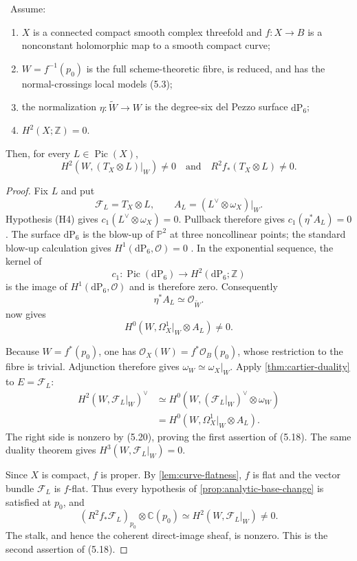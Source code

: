 \begin{theorem}
\label{thm:candidate-conductor}
\Verified\ Assume:
\begin{enumerate}[label=(H\arabic*)]
\item $X$ is a connected compact smooth complex threefold and
$f:X\to B$ is a nonconstant holomorphic map to a smooth compact curve;
\item $W=f^{-1}(p_0)$ is the full scheme-theoretic fibre, is reduced, and
has the normal-crossings local models (5.3);
\item the normalization $\eta:\widetilde W\to W$ is the degree-six del
Pezzo surface $\mathrm{dP}_6$;
\item $H^2(X;\mathbb Z)=0$.
\end{enumerate}
Then, for every $L\in\operatorname{Pic}(X)$,
\[
H^2(W,(T_X\otimes L)|_W)\ne0
\quad\text{and}\quad
R^2f_*(T_X\otimes L)\ne0.
\tag{5.18}
\]
\end{theorem}

\begin{proof}
Fix $L$ and put
\[
\mathcal F_L=T_X\otimes L,\qquad
A_L=(L^\vee\otimes\omega_X)|_W.
\]
Hypothesis (H4) gives $c_1(L^\vee\otimes\omega_X)=0$.  Pullback therefore
gives $c_1(\eta^*A_L)=0$.  The surface $\mathrm{dP}_6$ is the blow-up of
$\mathbb P^2$ at three noncollinear points; the standard blow-up calculation
gives $H^1(\mathrm{dP}_6,\mathcal O)=0$
\cite[Chapter~V]{Hartshorne1977}.  In the exponential sequence, the kernel
of
\[
c_1:\operatorname{Pic}(\mathrm{dP}_6)\longrightarrow
H^2(\mathrm{dP}_6;\mathbb Z)
\]
is the image of $H^1(\mathrm{dP}_6,\mathcal O)$ and is therefore zero.
Consequently
\[
\eta^*A_L\simeq\mathcal O_{\widetilde W}.
\tag{5.19}
\]
 now gives
\[
H^0(W,\Omega^1_X|_W\otimes A_L)\ne0.
\tag{5.20}
\]

Because $W=f^*(p_0)$, one has
$\mathcal O_X(W)=f^*\mathcal O_B(p_0)$, whose restriction to the fibre is
trivial.  Adjunction therefore gives $\omega_W\simeq\omega_X|_W$.
Apply \cref{thm:cartier-duality} to $E=\mathcal F_L$:
\[
\begin{split}
H^2(W,\mathcal F_L|_W)^\vee
&\simeq H^0(W,(\mathcal F_L|_W)^\vee\otimes\omega_W)\\
&=H^0(W,\Omega^1_X|_W\otimes A_L).
\end{split}
\]
The right side is nonzero by (5.20), proving the first assertion of (5.18).
The same duality theorem gives
$H^3(W,\mathcal F_L|_W)=0$.

Since $X$ is compact, $f$ is proper.  By
\cref{lem:curve-flatness}, $f$ is flat and the vector bundle
$\mathcal F_L$ is $f$-flat.  Thus every hypothesis of
\cref{prop:analytic-base-change} is satisfied at $p_0$, and
\[
(R^2f_*\mathcal F_L)_{p_0}\otimes\mathbb C(p_0)
\simeq H^2(W,\mathcal F_L|_W)\ne0.
\]
The stalk, and hence the coherent direct-image sheaf, is nonzero.  This is
the second assertion of (5.18).
\end{proof}

